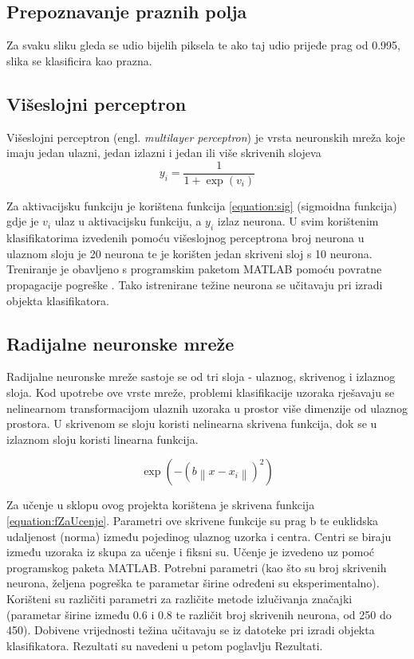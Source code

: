 \documentclass[a4paper,twocolumn,dvipdfm]{article}
\begin{document}
\subsection{Prepoznavanje praznih polja}
Za svaku sliku gleda se udio bijelih piksela te ako taj udio prijeđe prag od 0.995, slika se klasificira kao prazna.

\subsection{Višeslojni perceptron}
Višeslojni perceptron \cite{rosenblatt1958perceptron} (engl. \emph{multilayer
perceptron}) je vrsta neuronskih mreža koje imaju jedan ulazni, jedan izlazni i
jedan ili više skrivenih slojeva
\begin{equation}
y_i = \frac{1}{1 + \exp(v_i)}
\label{equation:sig}
\end{equation}

Za aktivacijsku funkciju je korištena funkcija \ref{equation:sig} (sigmoidna
funkcija) gdje je $v_i$ ulaz u aktivacijsku funkciju, a $y_i$ izlaz neurona. U
svim korištenim klasifikatorima izvedenih pomoću višeslojnog perceptrona broj
neurona u ulaznom sloju je 20 neurona te je korišten jedan skriveni sloj s 10
neurona. Treniranje je obavljeno s programskim paketom MATLAB pomoću povratne
propagacije pogreške \cite{rumelhart1986learning}. Tako istrenirane težine
neurona se učitavaju pri izradi objekta klasifikatora.

\subsection{Radijalne neuronske mreže}
Radijalne neuronske mreže sastoje se od tri sloja - ulaznog, skrivenog i
izlaznog sloja. Kod upotrebe ove vrste mreže, problemi klasifikacije uzoraka
rješavaju se nelinearnom transformacijom ulaznih uzoraka u prostor više
dimenzije od ulaznog prostora. U skrivenom se sloju koristi nelinearna skrivena
funkcija, dok se u izlaznom sloju koristi linearna funkcija.

\begin{equation}
\exp(-\left (b \left \| x - x_{i} \right \|  \right )^{2})
\label{equation:fZaUcenje}
\end{equation}

Za učenje u sklopu ovog projekta korištena je skrivena funkcija
\ref{equation:fZaUcenje}. Parametri ove skrivene funkcije su prag b te euklidska
udaljenost (norma) između pojedinog ulaznog uzorka i centra. Centri se biraju
između uzoraka iz skupa za učenje i fiksni su. Učenje je izvedeno uz pomoć
programskog paketa MATLAB. Potrebni parametri (kao što su broj skrivenih
neurona, željena pogreška te parametar širine određeni su eksperimentalno).
Korišteni su različiti parametri za  različite metode izlučivanja značajki
(parametar širine između 0.6 i 0.8 te različit broj skrivenih neurona, od 250 do
450). Dobivene vrijednosti težina učitavaju se iz datoteke pri izradi objekta
klasifikatora. Rezultati su navedeni u petom poglavlju Rezultati.
\end{document}

